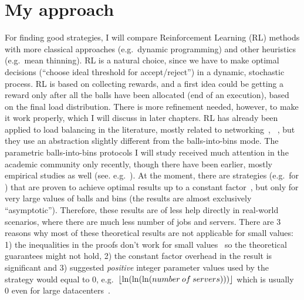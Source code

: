 \section{My approach}

For finding good strategies, I will compare Reinforcement Learning (RL) methods with more classical approaches (e.g.\ dynamic programming) and other heuristics (e.g.\ mean thinning). RL is a natural choice, since we have to make optimal decisions (``choose ideal threshold for accept/reject'') in a dynamic, stochastic process. RL is based on collecting rewards, and a first idea could be getting a reward only after all the balls have been allocated (end of an execution), based on the final load distribution. There is more refinement needed, however, to make it work properly, which I will discuss in later chapters. RL has already been applied to load balancing in the literature, mostly related to networking~\cite{attiah2020RLcellular},~\cite{yeo2021controller} , but they use an abstraction slightly different from the balls-into-bins mode. The parametric balls-into-bins protocols I will study received much attention in the academic community only recently, though there have been earlier, mostly empirical studies as well (see. e.g.~\cite{derek1986twothinningfirstattempt}). At the moment, there are strategies (e.g.\ for \TwoThinning) that are proven to achieve optimal results up to a constant factor~\cite{feldheim2021thinning}, but only for very large values of balls and bins (the results are almost exclusively ``asymptotic''). Therefore, these results are of less help directly in real-world scenarios, where there are much less number of jobs and servers. There are $3$ reasons why most of these theoretical results are not applicable for small values: 1) the inequalities in the proofs don't work for small values~\cite{feldheim2021longtermthinning} so the theoretical guarantees might not hold, 2) the constant factor overhead in the result is significant and 3) suggested \textit{positive} integer parameter values used by the strategy would equal to $0$, e.g.\ $\lfloor\ln(\ln(\ln(number\: of \: servers)))\rfloor$ which is usually $0$ even for large datacenters~\cite{uzaman2019datacentersize}.




